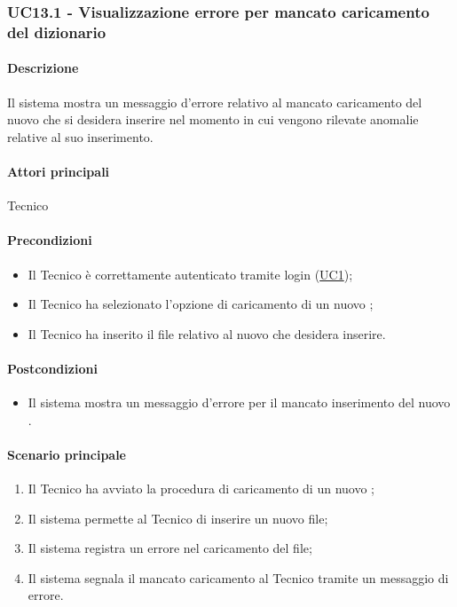 \subsubsection{UC13.1 - Visualizzazione errore per mancato caricamento del dizionario}\label{UC13point1}
\paragraph*{Descrizione} Il sistema mostra un messaggio d’errore relativo al mancato caricamento del nuovo  che si desidera inserire nel momento in cui vengono rilevate anomalie relative al suo inserimento.
\paragraph*{Attori principali} Tecnico
\paragraph*{Precondizioni}
\begin{itemize}
  \item Il Tecnico è correttamente autenticato tramite login (\hyperref[UC1]{UC1});
  \item Il Tecnico ha selezionato l’opzione di caricamento di un nuovo ;
  \item Il Tecnico ha inserito il file relativo al nuovo  che desidera inserire.
  
\end{itemize}
\paragraph*{Postcondizioni}
\begin{itemize}
  \item Il sistema mostra un messaggio d’errore per il mancato inserimento del nuovo .
\end{itemize}
\paragraph*{Scenario principale}
\begin{enumerate}
  \item Il Tecnico ha avviato la procedura di caricamento di un nuovo ;
  \item Il sistema permette al Tecnico di inserire un nuovo file;
  \item Il sistema registra un errore nel caricamento del file;
  \item Il sistema segnala il mancato caricamento al Tecnico tramite un messaggio di errore.  
\end{enumerate}


